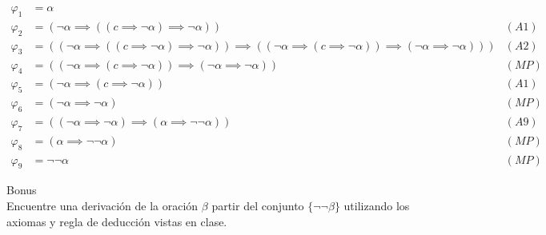\begin{sol}
    \begin{align*}
        \varphi_1 & = \alpha                                                                                                                                                                             \\
        \varphi_2 & = (\neg \alpha \implies ((c \implies \neg \alpha )\implies \neg \alpha))                                                                                                      & (A1) \\
        \varphi_3 & = ((\neg \alpha \implies ((c \implies \neg \alpha)\implies \neg \alpha))\implies ((\neg \alpha \implies (c \implies \neg \alpha))\implies(\neg \alpha \implies \neg \alpha))) & (A2) \\
        \varphi_4 & = ((\neg \alpha \implies (c \implies \neg \alpha))\implies (\neg \alpha \implies \neg \alpha))                                                                                & (MP) \\
        \varphi_5 & = (\neg \alpha \implies (c \implies \neg \alpha))                                                                                                                             & (A1) \\
        \varphi_6 & = (\neg \alpha \implies \neg \alpha)                                                                                                                                          & (MP) \\
        \varphi_7 & = ((\neg \alpha \implies \neg \alpha) \implies (\alpha \implies \neg \neg \alpha))                                                                                            & (A9) \\
        \varphi_8 & = (\alpha \implies \neg \neg \alpha)                                                                                                                                          & (MP) \\
        \varphi_9 & = \neg \neg \alpha                                                                                                                                                            & (MP)
    \end{align*}
\end{sol}

\begin{prob}
    Bonus
    \\
    Encuentre una derivación de la oración $\beta$  partir del conjunto $\{\neg \neg \beta\}$ utilizando los axiomas y regla de deducción vistas en clase.
\end{prob}

